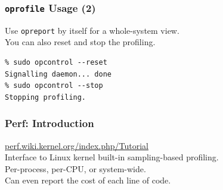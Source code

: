\begin{frame}[fragile]
  \frametitle{{\tt oprofile} Usage (2)}
  

\large
\begin{changemargin}{1.5cm}
    Use {\tt opreport} by itself for a whole-system view.\\
    You can also reset and stop the profiling.

  \begin{lstlisting}
% sudo opcontrol --reset 
Signalling daemon... done
% sudo opcontrol --stop
Stopping profiling.
  \end{lstlisting}
  \end{changemargin}
\end{frame}

\begin{frame}
  \frametitle{Perf: Introduction}

\large
\begin{changemargin}{1cm}

    \url{perf.wiki.kernel.org/index.php/Tutorial}\\[1em]

    Interface to Linux kernel built-in sampling-based profiling.\\
    Per-process, per-CPU, or system-wide.\\
    Can even report the cost of each line of code.
    \end{changemargin}
\end{frame}

